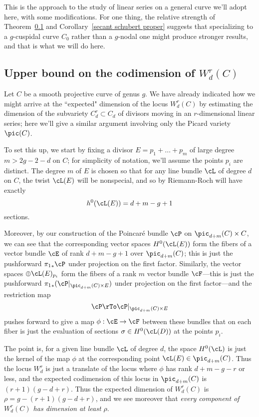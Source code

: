 This is the approach to the study of linear series on a general curve we'll adopt here, with some modifications. For one thing, the relative strength of Theorem~\ref{} and Corollary~\ref{secant schubert proper} suggests that specializing to a $g$-cuspidal curve $C_0$ rather than a $g$-nodal one might produce stronger results, and that is what we will do here.

\subsection{Upper bound on the codimension of $W^r_d(C)$}

Let $C$ be a smooth projective curve of genus $g$. We have already indicated how we might arrive at the ``expected" dimension of the locus $W^r_d(C)$ by estimating the dimension of the subvariety $C^r_d \subset C_d$ of divisors moving in an $r$-dimensional linear series; here we'll give a similar argument involving only the Picard variety $\pic(C)$.

To set this up, we start by fixing a divisor $E = p_1 + \dots + p_m$ of large degree $m > 2g-2-d$ on $C$; for simplicity of notation, we'll assume the points $p_i$ are distinct. The degree $m$ of $E$ is chosen so that for any line bundle $\cL$ of degree $d$ on $C$, the twist $\cL(E)$ will be nonspecial, and so by Riemann-Roch will have exactly
$$
h^0(\cL(E)) = d + m - g + 1 
$$
sections. 

Moreover, by our construction of the Poincar\'e bundle $\cP$ on $\pic_{d+m}(C) \times C$, we can see that the corresponding vector spaces $H^0(\cL(E))$ form the fibers of a vector bundle $\cE$ of rank $d + m - g + 1$ over $\pic_{d+m}(C)$; this is just the pushforward ${\pi_1}_*\cP$ under projection on the first factor. Similarly, the vector spaces $\oplus \cL(E)_{p_i}$ form the fibers of a rank $m$ vector bundle $\cF$---this is just the pushforward ${\pi_1}_*(\cP|_{\pic_{d+m}(C) \times E})$ under projection on the first factor---and the restriction map
$$
\cP  \rTo \cP|_{\pic_{d+m}(C) \times E}
$$
pushes forward to give a map $\phi : \cE \to \cF$ between these bundles that on each fiber is just the evaluation of sections $\sigma \in H^0(\cL(D))$ at the points $p_i$.

The point is, for a given line bundle $\cL$ of degree $d$, the space $H^0(\cL)$ is just the kernel of the map $\phi$ at the corresponding point $\cL(E) \in \pic_{d+m}(C)$. Thus the locus $W^r_d$ is just a translate of the locus where $\phi$ has rank $d+m-g-r$ or less, and the expected codimension of this locus in $\pic_{d+m}(C)$ is $(r+1)(g-d+r)$. Thus the expected dimension of $W^r_d(C)$ is $\rho = g - (r+1)(g-d+r)$, and we see moreover that \emph{every component of $W^r_d(C)$ has dimension at least $\rho$}.

